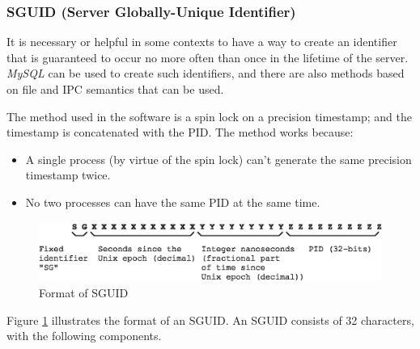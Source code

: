 \documentclass[letterpaper,10pt,titlepage]{article}
\begin{document}

\subsubsection{SGUID (Server Globally-Unique Identifier)}
\label{stdd0:sdty0:sgui0}

%
%
It is necessary or helpful in some contexts to have a way to create an
identifier that is guaranteed to occur no more often than once in the lifetime
of the server.  \emph{MySQL} can be used to create such identifiers, and there
are also methods based on file and IPC semantics that can be used.

The method used in the software is a spin lock on a precision
timestamp; and the timestamp is concatenated with the PID.  The method works
because:

\begin{itemize}
\item A single process (by virtue of the spin lock) can't generate the same
      precision timestamp twice.
\item No two processes can have the same PID at the same time.
\end{itemize}

\begin{figure}
\centering
\includegraphics[width=4.6in]{sguidformat01.eps}
\caption{Format of SGUID}
\label{fig:stdd0:sdty0:sgui0:00}
\end{figure}

Figure \ref{fig:stdd0:sdty0:sgui0:00} illustrates the format of
an SGUID.  An SGUID consists of 32 characters, with the following
components.
\end{document}

